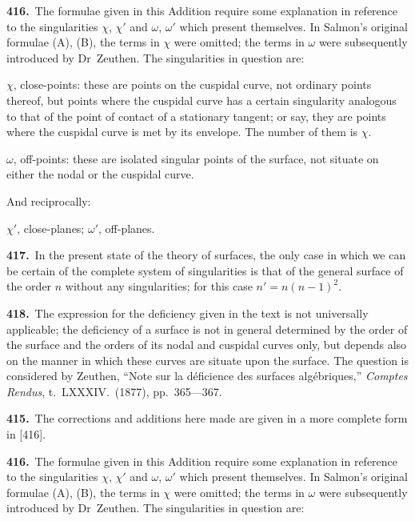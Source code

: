 \documentclass[11pt,a4paper]{article}
\theoremstyle{plain}
\theoremstyle{definition}
\theoremstyle{remark}
\begin{document}
\noindent\textbf{416.}\ The formulae given in this Addition require some explanation in reference to the singularities $\chi$, $\chi'$ and $\omega$, $\omega'$ which present themselves. In Salmon's original formulae (A), (B), the terms in $\chi$ were omitted; the terms in $\omega$ were subsequently introduced by Dr~Zeuthen. The singularities in question are:

$\chi$, close-points: these are points on the cuspidal curve, not ordinary points thereof, but points where the cuspidal curve has a certain singularity analogous to that of the point of contact of a stationary tangent; or say, they are points where the cuspidal curve is met by its envelope. The number of them is $\chi$.

$\omega$, off-points: these are isolated singular points of the surface, not situate on either the nodal or the cuspidal curve.

And reciprocally:

$\chi'$, close-planes; $\omega'$, off-planes.

\smallskip

\noindent\textbf{417.}\ In the present state of the theory of surfaces, the only case in which we can be certain of the complete system of singularities is that of the general surface of the order $n$ without any singularities; for this case $n'=n(n-1)^2$.

\smallskip

\noindent\textbf{418.}\ The expression for the deficiency given in the text is not universally applicable; the deficiency of a surface is not in general determined by the order of the surface and the orders of its nodal and cuspidal curves only, but depends also on the manner in which these curves are situate upon the surface. The question is considered by Zeuthen, ``Note sur la d\'{e}ficience des surfaces alg\'{e}briques,'' \textit{Comptes Rendus}, t.~LXXXIV.\ (1877), pp.~365---367.

\newpage
\setcounter{page}{624}

\smallskip

\noindent\textbf{415.}\ The corrections and additions here made are given in a more complete form in [416].

\smallskip

\noindent\textbf{416.}\ The formulae given in this Addition require some explanation in reference to the singularities $\chi$, $\chi'$ and $\omega$, $\omega'$ which present themselves. In Salmon's original formulae (A), (B), the terms in $\chi$ were omitted; the terms in $\omega$ were subsequently introduced by Dr~Zeuthen. The singularities in question are:
\end{document}
